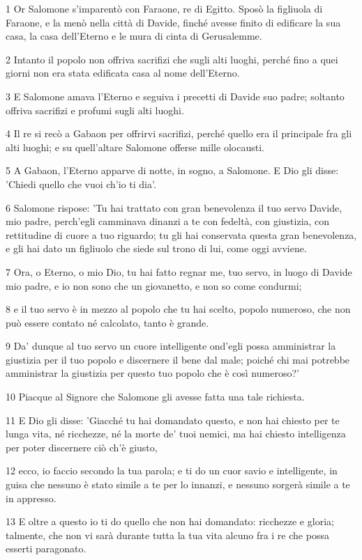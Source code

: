 \par 1 Or Salomone s'imparentò con Faraone, re di Egitto. Sposò la figliuola di Faraone, e la menò nella città di Davide, finché avesse finito di edificare la sua casa, la casa dell'Eterno e le mura di cinta di Gerusalemme.
\par 2 Intanto il popolo non offriva sacrifizi che sugli alti luoghi, perché fino a quei giorni non era stata edificata casa al nome dell'Eterno.
\par 3 E Salomone amava l'Eterno e seguiva i precetti di Davide suo padre; soltanto offriva sacrifizi e profumi sugli alti luoghi.
\par 4 Il re si recò a Gabaon per offrirvi sacrifizi, perché quello era il principale fra gli alti luoghi; e su quell'altare Salomone offerse mille olocausti.
\par 5 A Gabaon, l'Eterno apparve di notte, in sogno, a Salomone. E Dio gli disse: 'Chiedi quello che vuoi ch'io ti dia'.
\par 6 Salomone rispose: 'Tu hai trattato con gran benevolenza il tuo servo Davide, mio padre, perch'egli camminava dinanzi a te con fedeltà, con giustizia, con rettitudine di cuore a tuo riguardo; tu gli hai conservata questa gran benevolenza, e gli hai dato un figliuolo che siede sul trono di lui, come oggi avviene.
\par 7 Ora, o Eterno, o mio Dio, tu hai fatto regnar me, tuo servo, in luogo di Davide mio padre, e io non sono che un giovanetto, e non so come condurmi;
\par 8 e il tuo servo è in mezzo al popolo che tu hai scelto, popolo numeroso, che non può essere contato né calcolato, tanto è grande.
\par 9 Da' dunque al tuo servo un cuore intelligente ond'egli possa amministrar la giustizia per il tuo popolo e discernere il bene dal male; poiché chi mai potrebbe amministrar la giustizia per questo tuo popolo che è così numeroso?'
\par 10 Piacque al Signore che Salomone gli avesse fatta una tale richiesta.
\par 11 E Dio gli disse: 'Giacché tu hai domandato questo, e non hai chiesto per te lunga vita, né ricchezze, né la morte de' tuoi nemici, ma hai chiesto intelligenza per poter discernere ciò ch'è giusto,
\par 12 ecco, io faccio secondo la tua parola; e ti do un cuor savio e intelligente, in guisa che nessuno è stato simile a te per lo innanzi, e nessuno sorgerà simile a te in appresso.
\par 13 E oltre a questo io ti do quello che non hai domandato: ricchezze e gloria; talmente, che non vi sarà durante tutta la tua vita alcuno fra i re che possa esserti paragonato.
